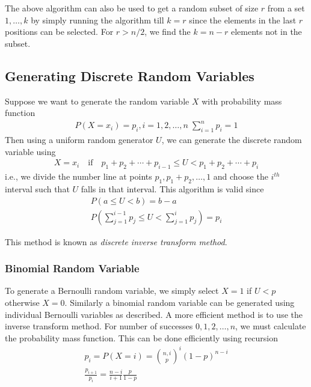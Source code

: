 \documentclass[../probability-notes.tex]{subfiles}
\begin{document}
    The above algorithm can also be used to get a random subset of size $r$ from a set $1, \dots, k$ by simply running the algorithm till $k = r$ since the elements in the last $r$ positions can be selected. For $r > n/2$, we find the $k=n-r$ elements not in the subset.


    \subsection{Generating Discrete Random Variables}
    Suppose we want to generate the random variable $X$ with probability mass function
    \begin{align*}
        P(X = x_{i}) = p_{i}, i = 1, 2, \ldots, n\; \sum_{i=1}^{n} p_{i} = 1 
    \end{align*}
    Then using a uniform random generator $U$, we can generate the discrete random variable using
    \begin{align*}
        X = x_{i} \quad \text{if} \quad p_{1} + p_{2} +\cdots + p_{i-1} \leq U < p_{1} + p_{2} +\cdots + p_{i} 
    \end{align*}
    i.e., we divide the number line at points $p_{1}, p_{1}+p_{2}, \ldots, 1$ and choose the $i^{th}$ interval such that $U$ falls in that interval. This algorithm is valid since
    \begin{gather*}
        P(a \leq U < b) = b-a\\
        P(\sum_{j=1}^{i-1}p_{j} \leq U < \sum_{j=1}^{i}p_{j}) = p_{i}
    \end{gather*}

    This method is known as \emph{discrete inverse transform method}.\newline


    \subsubsection{Binomial Random Variable}
    To generate a Bernoulli random variable, we simply select $X = 1$ if $U < p$ otherwise $X = 0$. Similarly a binomial random variable can be generated using individual Bernoulli variables as described. A more efficient method is to use the inverse transform method. For number of successes $0, 1, 2, \ldots, n$, we must calculate the probability mass function. This can be done efficiently using recursion
    \begin{gather*}
        p_{i} = P(X = i) = \binom{n, i} p^{i} (1-p)^{n-i}\\
        \frac{p_{i+1}}{p_{i}} = \frac{n-i}{i+1} \frac{p}{1-p}
    \end{gather*}
\end{document}
